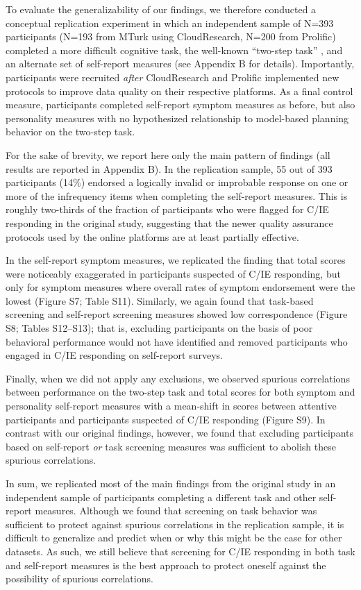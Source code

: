 \documentclass[a4paper,notitlepage,12pt]{article}
\begin{document}
To evaluate the generalizability of our findings, we therefore conducted a conceptual replication experiment in which an independent sample of N=393 participants (N=193 from MTurk using CloudResearch, N=200 from Prolific) completed a more difficult cognitive task, the well-known ``two-step task'' \cite{daw2011model}, and an alternate set of self-report measures (see Appendix B for details). Importantly, participants were recruited \textit{after} CloudResearch and Prolific implemented new protocols to improve data quality on their respective platforms. As a final control measure, participants completed self-report symptom measures as before, but also personality measures with no hypothesized relationship to model-based planning behavior on the two-step task. 

For the sake of brevity, we report here only the main pattern of findings (all results are reported in Appendix B). In the replication sample, 55 out of 393 participants (14\%) endorsed a logically invalid or improbable response on one or more of the infrequency items when completing the self-report measures. This is roughly two-thirds of the fraction of participants who were flagged for C/IE responding in the original study, suggesting that the newer quality assurance protocols used by the online platforms are at least partially effective. 

In the self-report symptom measures, we replicated the finding that total scores were noticeably exaggerated in participants suspected of C/IE responding, but only for symptom measures where overall rates of symptom endorsement were the lowest (Figure S7; Table S11). Similarly, we again found that task-based screening and self-report screening measures showed low correspondence (Figure S8; Tables S12--S13); that is, excluding participants on the basis of poor behavioral performance would not have identified and removed participants who engaged in C/IE responding on self-report surveys. 

Finally, when we did not apply any exclusions, we observed spurious correlations between performance on the two-step task and total scores for both symptom and personality self-report measures with a mean-shift in scores between attentive participants and participants suspected of C/IE responding (Figure S9). In contrast with our original findings, however, we found that excluding participants based on self-report \textit{or} task screening measures was sufficient to abolish these spurious correlations. 

In sum, we replicated most of the main findings from the original study in an independent sample of participants completing a different task and other self-report measures. Although we found that screening on task behavior was sufficient to protect against spurious correlations in the replication sample, it is difficult to generalize and predict when or why this might be the case for other datasets. As such, we still believe that screening for C/IE responding in both task and self-report measures is the best approach to protect oneself against the possibility of spurious correlations.
\end{document}
